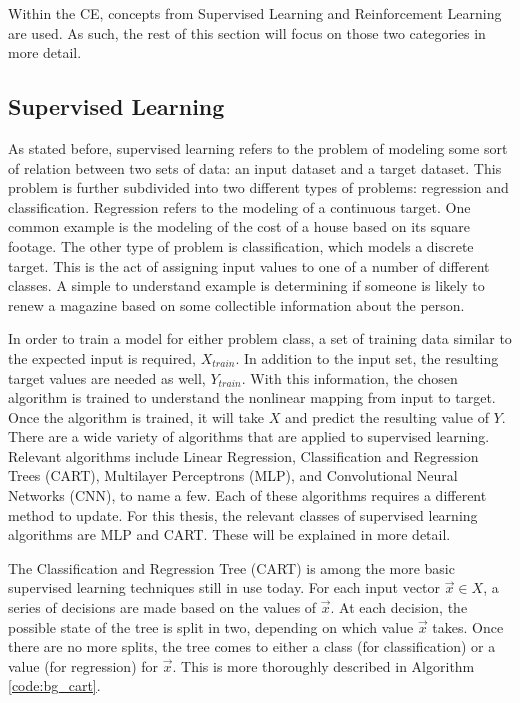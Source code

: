 	\par Within the CE, concepts from Supervised Learning and Reinforcement Learning are used. As such, the rest of this section will focus on those two categories in more detail. 
	\subsection{Supervised Learning}
	\par As stated before, supervised learning refers to the problem of modeling some sort of relation between two sets of data: an input dataset and a target dataset. This problem is further subdivided into two different types of problems: regression and classification. Regression refers to the modeling of a continuous target. One common example is the modeling of the cost of a house based on its square footage. The other type of problem is classification, which models a discrete target. This is the act of assigning input values to one of a number of different classes. A simple to understand example is determining if someone is likely to renew a magazine based on some collectible information about the person.  
	\par In order to train a model for either problem class, a set of training data similar to the expected input is required, $X_{train}$. In addition to the input set, the resulting target values are needed as well, $Y_{train}$. With this information, the chosen algorithm is trained to understand the nonlinear mapping from input to target. Once the algorithm is trained, it will take $X$ and predict the resulting value of $Y$. There are a wide variety of algorithms that are applied to supervised learning. Relevant algorithms include Linear Regression, Classification and Regression Trees (CART), Multilayer Perceptrons (MLP), and Convolutional Neural Networks (CNN), to name a few. Each of these algorithms requires a different method to update. For this thesis, the relevant classes of supervised learning algorithms are MLP and CART. These will be explained in more detail.
	\par The Classification and Regression Tree (CART) is among the more basic supervised learning techniques still in use today. For each input vector $\vec{x} \in X$, a series of decisions are made based on the values of $\vec{x}$. At each decision, the possible state of the tree is split in two, depending on which value $\vec{x}$ takes. Once there are no more splits, the tree comes to either a class (for classification) or a value (for regression) for $\vec{x}$. This is more thoroughly described in Algorithm \ref{code:bg_cart}.
